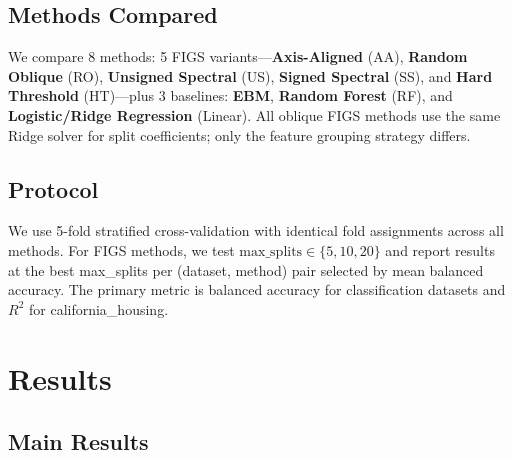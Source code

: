 \documentclass[11pt,letterpaper]{article}
\begin{document}
\subsection{Methods Compared}

We compare 8 methods: 5 FIGS variants---\textbf{Axis-Aligned} (AA), \textbf{Random Oblique} (RO), \textbf{Unsigned Spectral} (US), \textbf{Signed Spectral} (SS), and \textbf{Hard Threshold} (HT)---plus 3 baselines: \textbf{EBM}, \textbf{Random Forest} (RF), and \textbf{Logistic/Ridge Regression} (Linear).
All oblique FIGS methods use the same Ridge solver for split coefficients; only the feature grouping strategy differs.

\subsection{Protocol}

We use 5-fold stratified cross-validation with identical fold assignments across all methods.
For FIGS methods, we test $\text{max\_splits} \in \{5, 10, 20\}$ and report results at the best max\_splits per (dataset, method) pair selected by mean balanced accuracy.
The primary metric is balanced accuracy for classification datasets and $R^2$ for california\_housing.

\section{Results}

\subsection{Main Results}
\end{document}
